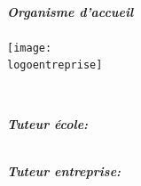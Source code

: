 {\begin{titlepage}
        {\scshape{} \filiere{} \\ \master{} \par}
        \vspace{1cm}

        {\large{} \annee{} \par}
        \vspace{1cm}

        {\large{} \dates{} \par}
        \vspace{1.5cm}

        \begin{minipage}{0.4\textwidth}
            \begin{flushleft}
                \emph{\textbf{Organisme d'accueil}}\\
                \text{\nomentreprise}\\
                \texttt{[image: \\logoentreprise]} \\
            \end{flushleft}
        \end{minipage}
        ~
        \begin{minipage}{0.4\textwidth}
            \begin{flushright}
                \emph{\textbf{Tuteur école:}} \\
                \tuteurecole{} \\
            \end{flushright}
            \begin{flushright}
                \emph{\textbf{Tuteur entreprise:}} \\
                \tuteurentreprise{} \\
            \end{flushright}
        \end{minipage}\\[2cm]

        \vfill{}


    \end{titlepage}
    \newpage{}
}

